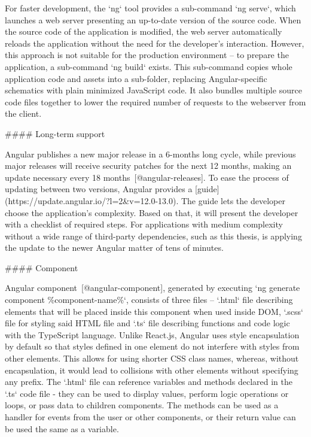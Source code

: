 \documentclass[
  digital, %
  oneside, %
  lof,     %
  nolot,     %
]{fithesis4}
\begin{document}
For faster development, the `ng` tool provides a sub-command `ng serve`, which launches a web server presenting an up-to-date version of the source code. When the source code of the application is modified, the web server automatically reloads the application without the need for the developer's interaction. However, this approach is not suitable for the production environment -- to prepare the application, a sub-command `ng build` exists. This sub-command copies whole application code and assets into a sub-folder, replacing Angular-specific schematics with plain minimized JavaScript code. It also bundles multiple source code files together to lower the required number of requests to the webserver from the client.

#### Long-term support

Angular publishes a new major release in a 6-months long cycle, while previous major releases will receive security patches for the next 12 months, making an update necessary every 18 months~[@angular-releases]. To ease the process of updating between two versions, Angular provides a [guide](https://update.angular.io/?l=2&v=12.0-13.0). The guide lets the developer choose the application's complexity. Based on that, it will present the developer with a checklist of required steps. For applications with medium complexity without a wide range of third-party dependencies, such as this thesis, is applying the update to the newer Angular matter of tens of minutes.

#### Component

Angular component~[@angular-component], generated by executing `ng generate component \%component-name\%`, consists of three files -- `.html` file describing elements that will be placed inside this component when used inside DOM, `.scss` file for styling said HTML file and `.ts` file describing functions and code logic with the TypeScript language. Unlike React.js, Angular uses style encapsulation by default so that styles defined in one element do not interfere with styles from other elements. This allows for using shorter CSS class names, whereas, without encapsulation, it would lead to collisions with other elements without specifying any prefix. The `.html` file can reference variables and methods declared in the `.ts` code file - they can be used to display values, perform logic operations or loops, or pass data to children components. The methods can be used as a handler for events from the user or other components, or their return value can be used the same as a variable.
\end{document}
